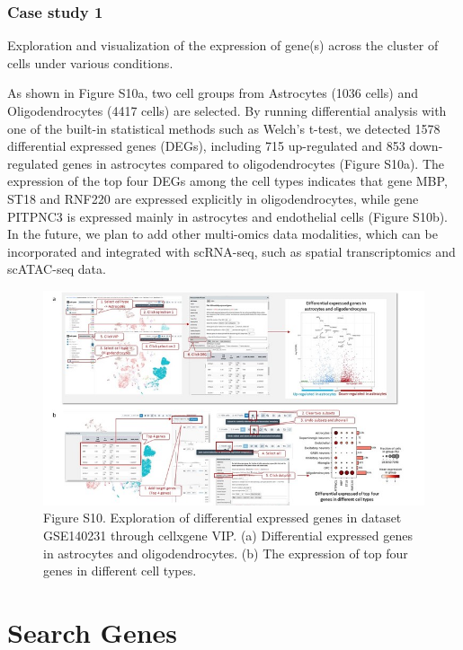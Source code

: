 \documentclass[
]{book}
\begin{document}
\hypertarget{case-study-1-1}{%
\subsubsection{Case study 1}\label{case-study-1-1}}

Exploration and visualization of the expression of gene(s) across the cluster of cells under various conditions.

As shown in Figure S10a, two cell groups from Astrocytes (1036 cells) and Oligodendrocytes (4417 cells) are selected. By running differential analysis with one of the built-in statistical methods such as Welch's t-test, we detected 1578 differential expressed genes (DEGs), including 715 up-regulated and 853 down-regulated genes in astrocytes compared to oligodendrocytes (Figure S10a). The expression of the top four DEGs among the cell types indicates that gene MBP, ST18 and RNF220 are expressed explicitly in oligodendrocytes, while gene PITPNC3 is expressed mainly in astrocytes and endothelial cells (Figure S10b). In the future, we plan to add other multi-omics data modalities, which can be incorporated and integrated with scRNA-seq, such as spatial transcriptomics and scATAC-seq data.

\begin{figure}
\centering
\includegraphics{figures/S2.jpg}
\caption{Figure S10. Exploration of differential expressed genes in dataset GSE140231 through cellxgene VIP. (a) Differential expressed genes in astrocytes and oligodendrocytes. (b) The expression of top four genes in different cell types.}
\end{figure}

\hypertarget{search-genes}{%
\section{Search Genes}\label{search-genes}}
\end{document}
